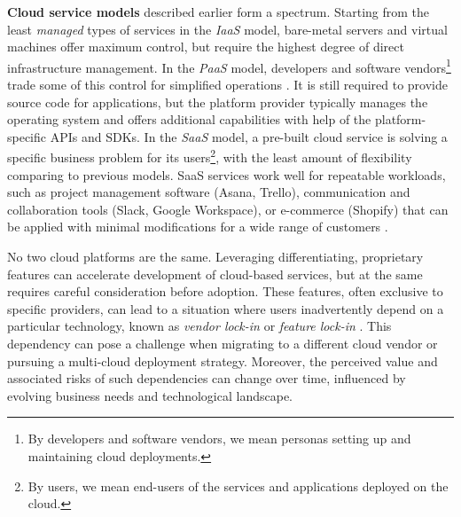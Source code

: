 

\textbf{Cloud service models} described earlier form a spectrum. Starting from the least \emph{managed} types of services in the \emph{IaaS} model, bare-metal servers and virtual machines offer maximum control, but require the highest degree of direct infrastructure management. In the \emph{PaaS} model, developers and software vendors\footnote{By developers and software vendors, we mean personas setting up and maintaining cloud deployments.} trade some of this control for simplified operations \cite{walraven2014comparing}. It is still required to provide source code for applications, but the platform provider typically manages the operating system and offers additional capabilities with help of the platform-specific APIs and SDKs. In the \emph{SaaS} model, a pre-built cloud service is solving a specific business problem for its users\footnote{By users, we mean end-users of the services and applications deployed on the cloud.}, with the least amount of flexibility comparing to previous models. SaaS services work well for repeatable workloads, such as project management software (Asana, Trello), communication and collaboration tools (Slack, Google Workspace), or e-commerce (Shopify) that can be applied with minimal modifications for a wide range of customers \cite{kavis2014architecting-cloud-service-models}.




No two cloud platforms are the same. Leveraging differentiating, proprietary features can accelerate development of cloud-based services, but at the same requires careful consideration before adoption. These features, often exclusive to specific providers, can lead to a situation where users inadvertently depend on a particular technology, known as \emph{vendor lock-in} or \emph{feature lock-in} \cite{petcu2011portability}. This dependency can pose a challenge when migrating to a different cloud vendor or pursuing a multi-cloud deployment strategy. Moreover, the perceived value and associated risks of such dependencies can change over time, influenced by evolving business needs and technological landscape.

